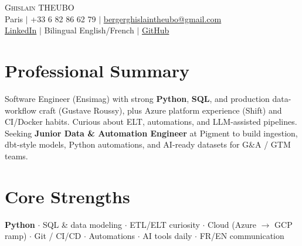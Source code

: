 \documentclass[letterpaper,10.5pt]{article}
\begin{document}
\begin{center}
{\Huge \scshape Ghislain THEUBO} \\ \vspace{2pt}
\small Paris $|$ +33 6 82 86 62 79 $|$ \href{mailto:bergerghislaintheubo@gmail.com}{bergerghislaintheubo@gmail.com} \\
\href{https://www.linkedin.com/in/berger-ghislain}{LinkedIn} $|$ Bilingual English/French $|$ \href{https://github.com/Bergerghislain}{GitHub}
\end{center}
\vspace{-6pt}
\section{Professional Summary}
\small{Software Engineer (Ensimag) with strong \textbf{Python}, \textbf{SQL}, and production data-workflow craft (Gustave Roussy), plus Azure platform experience (Shift) and CI/Docker habits. Curious about ELT, automations, and LLM-assisted pipelines. Seeking \textbf{Junior Data \& Automation Engineer} at Pigment to build ingestion, dbt-style models, Python automations, and AI-ready datasets for G\&A / GTM teams.}
\section{Core Strengths}
\small{\textbf{Python} $\cdot$ SQL \& data modeling $\cdot$ ETL/ELT curiosity $\cdot$ Cloud (Azure $\rightarrow$ GCP ramp) $\cdot$ Git / CI/CD $\cdot$ Automations $\cdot$ AI tools daily $\cdot$ FR/EN communication}
\end{document}
